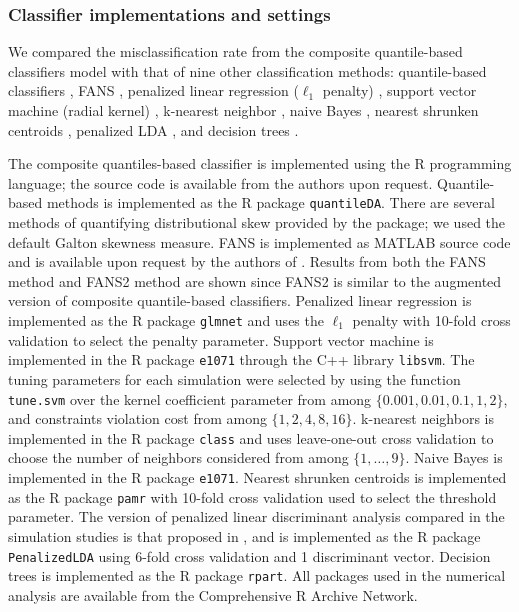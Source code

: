\documentclass{article}
\def\r/{\textsf{R}}
\def\matlab/{\textsf{MATLAB}}
\begin{document}
\subsubsection{Classifier implementations and settings}
\label{sec:classifier-implementations}

We compared the misclassification rate from the composite quantile-based
classifiers model with that of nine other classification methods: quantile-based
classifiers \cite{hennig2016}, FANS \cite{fan2016}, penalized linear regression
($\ell_1$ penalty) \cite{park2007}, support vector machine (radial kernel)
\cite{cortes1995}, k-nearest neighbor \cite{cover1967}, naive Bayes
\cite{hastie2009}, nearest shrunken centroids \cite{tibshirani2002}, penalized
LDA \cite{witten2011}, and decision trees \cite{breiman1984}.  

The composite quantiles-based classifier is implemented using the \r/
programming language; the source code is available from the authors upon
request.  Quantile-based methods is implemented as the \r/ package
\texttt{quantileDA}.  There are several methods of quantifying distributional
skew provided by the package; we used the default Galton skewness measure.  FANS
is implemented as \matlab/ \cite{matlab} source code and is available upon
request by the authors of \cite{fan2016}.  Results from both the FANS method and
FANS2 method are shown since FANS2 is similar to the augmented version of
composite quantile-based classifiers.  Penalized linear regression is
implemented as the \r/ package \texttt{glmnet} and uses the $\ell_1$ penalty
with 10-fold cross validation to select the penalty parameter.  Support vector
machine is implemented in the \r/ package \texttt{e1071} through the C++ library
\texttt{libsvm}.  The tuning parameters for each simulation were selected by
using the function \texttt{tune.svm} over the kernel coefficient parameter from
among $\{0.001, 0.01, 0.1, 1, 2\}$, and constraints violation cost from among
$\{1, 2, 4, 8, 16\}$.  k-nearest neighbors is implemented in the \r/ package
\texttt{class} and uses leave-one-out cross validation to choose the number of
neighbors considered from among $\{1, \dots, 9\}$.  Naive Bayes is implemented
in the \r/ package \texttt{e1071}.  Nearest shrunken centroids is implemented as
the \r/ package \texttt{pamr} with 10-fold cross validation used to select the
threshold parameter.  The version of penalized linear discriminant analysis
compared in the simulation studies is that proposed in \cite{witten2011}, and is
implemented as the \r/ package \texttt{PenalizedLDA} using 6-fold cross
validation and 1 discriminant vector.  Decision trees is implemented as the \r/
package \texttt{rpart}.  All packages used in the numerical analysis are
available from the Comprehensive \r/ Archive Network.
\end{document}
